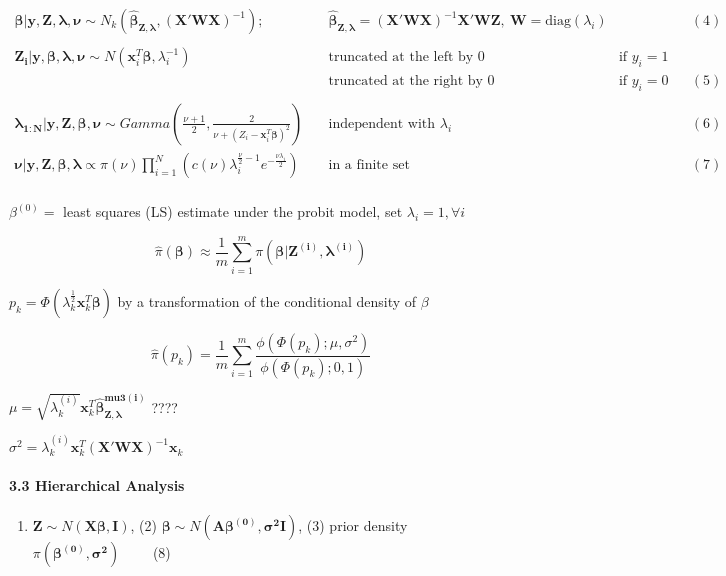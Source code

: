 \documentclass[
]{article}
\providecommand{\tightlist}{%
  \setlength{\itemsep}{0pt}\setlength{\parskip}{0pt}}
\begin{document}
\[
\begin{align} 
\boldsymbol{\beta|y,Z,\lambda,\nu}\sim N_k(\boldsymbol{\hat\beta_{Z,\lambda}},(\mathbf{X'WX})^{-1}); &\quad\boldsymbol{\hat\beta_{Z,\lambda}}=(\mathbf{X'WX})^{-1}\mathbf{X'WZ},\ \mathbf{W}=\mathrm{diag}(\lambda_i) &&& (4)\\
\\
\boldsymbol{Z_i|y,\beta,\lambda,\nu}\sim N(\mathbf{x}_i^T\boldsymbol{\beta},\lambda_i^{-1}) &\quad\text{truncated at the left by 0} & \text{if } y_i=1 &&\\
 &\quad\text{truncated at the right by 0} & \text{if } y_i=0 &&(5)\\
\\
\boldsymbol{\lambda_{1:N}|y,Z,\beta,\nu}\sim Gamma(\frac{\nu+1}{2},\frac{2}{\nu+(Z_i-\mathbf{x}_i^T\boldsymbol{\beta})^2})&\quad\text{independent with } \lambda_i&&&(6)\\
\boldsymbol{\nu|y,Z,\beta,\lambda}\propto\pi(\nu)\prod_{i=1}^N(c(\nu)\lambda_i^{\frac{\nu}{2}-1}e^{-\frac{\nu\lambda_i}{2}})&\quad\text{in a finite set}&&&(7)\\
\end{align}
\]

\(\beta^{(0)}=\) least squares (LS) estimate under the probit model, set
\(\lambda_i=1,\forall i\)

\[\hat\pi(\boldsymbol{\beta})\approx\frac1m\sum_{i=1}^m\pi(\boldsymbol{\beta|Z^{(i)},\lambda^{(i)}})\]

\(p_k=\Phi(\lambda_k^{\frac12}\mathbf{x}_k^T\boldsymbol{\beta})\) by a
transformation of the conditional density of \(\beta\)

\[\hat\pi(p_k)=\frac1m\sum_{i=1}^m\frac{\phi(\Phi(p_k);\mu,\sigma^2)}{\phi(\Phi(p_k);0,1)}\]

\(\mu=\sqrt{\lambda_k^{(i)}}\mathbf{x}_k^T\boldsymbol{\hat\beta_{Z,\lambda}^{mu3(i)}}\)
{????}

\(\sigma^2=\lambda_k^{(i)}\mathbf{x}_k^T(\mathbf{X'WX})^{-1}\mathbf{x}_k\)

\hypertarget{hierarchical-analysis}{%
\paragraph{3.3 Hierarchical Analysis}\label{hierarchical-analysis}}

\begin{enumerate}
\def\labelenumi{(\arabic{enumi})}
\tightlist
\item
  \(\mathbf{Z}\sim N(\boldsymbol{X\beta,I})\), (2)
  \(\boldsymbol{\beta}\sim N(\boldsymbol{A\beta^{(0)},\sigma^2I})\), (3)
  prior density \(\pi(\boldsymbol{\beta^{(0)},\sigma^2})\qquad\) (8)
\end{enumerate}
\end{document}
